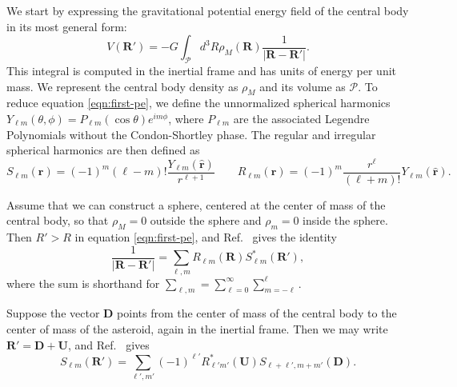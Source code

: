 \documentclass{aastex631}
\newcommand{\unit}[1]{\hat{\bm{#1}}}
\begin{document}
We start by expressing the gravitational potential energy field of the central body in its most general form:
\begin{equation}
V(\bm R') = -G\int_\mathcal{P} d^3 R \rho_M(\bm R) \frac{1}{|\bm{R}-\bm{R'}|}.
\label{eqn:first-pe}
\end{equation}
This integral is computed in the inertial frame and has units of energy per unit mass. We represent the central body density as $\rho_M$ and its volume as $\mathcal{P}$. To reduce equation \ref{eqn:first-pe}, we define the unnormalized spherical harmonics $Y_{\ell m}(\theta, \phi) = P_{\ell m}(\cos \theta)e^{im\phi}$, where $P_{\ell m}$ are the associated Legendre Polynomials without the Condon-Shortley phase. The regular and irregular spherical harmonics are then defined as
\begin{equation}
S_{\ell m}(\bm r) = (-1)^m (\ell - m)! \frac{Y_{\ell m}(\unit r)}{r^{\ell+1}} \qquad R_{\ell m} (\bm r) = (-1)^m \frac{r^\ell}{(\ell + m)!} Y_{\ell m}(\unit r).
\end{equation}

Assume that we can construct a sphere, centered at the center of mass of the central body, so that $\rho_M = 0$ outside the sphere and $\rho_m = 0$ inside the sphere. Then $R' > R$ in equation \ref{eqn:first-pe}, and Ref.~\cite{Gelderen1998TheSO} gives the identity
\begin{equation}
\frac{1}{|\bm R - \bm R'|} = \sum_{\ell, m} R_{\ell m}(\bm R) S_{\ell m}^*(\bm R'),
\label{eqn:1-over-r-expansion}
\end{equation}
where the sum is shorthand for $\sum_{\ell, m} = \sum_{\ell = 0}^\infty \sum_{m=-\ell}^\ell$.

Suppose the vector $\bm{D}$ points from the center of mass of the central body to the center of mass of the asteroid, again in the inertial frame. Then we may write $ \bm R' = \bm D + \bm U$, and Ref.~\cite{Gelderen1998TheSO} gives
\begin{equation}
S_{\ell m}(\bm R') = \sum_{\ell', m'} (-1)^{\ell'}R^*_{\ell' m'}(\bm U)S_{\ell+\ell', m + m'} (\bm D).
\end{equation}
\end{document}
